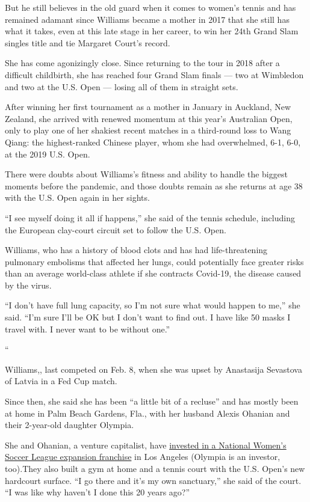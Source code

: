 But he still believes in the old guard when it comes to women's tennis
and has remained adamant since Williams became a mother in 2017 that she
still has what it takes, even at this late stage in her career, to win
her 24th Grand Slam singles title and tie Margaret Court's record.

She has come agonizingly close. Since returning to the tour in 2018
after a difficult childbirth, she has reached four Grand Slam finals ---
two at Wimbledon and two at the U.S. Open --- losing all of them in
straight sets.

After winning her first tournament as a mother in January in Auckland,
New Zealand, she arrived with renewed momentum at this year's Australian
Open, only to play one of her shakiest recent matches in a third-round
loss to Wang Qiang: the highest-ranked Chinese player, whom she had
overwhelmed, 6-1, 6-0, at the 2019 U.S. Open.

There were doubts about Williams's fitness and ability to handle the
biggest moments before the pandemic, and those doubts remain as she
returns at age 38 with the U.S. Open again in her sights.

``I see myself doing it all if happens,'' she said of the tennis
schedule, including the European clay-court circuit set to follow the
U.S. Open.

Williams, who has a history of blood clots and has had life-threatening
pulmonary embolisms that affected her lungs, could potentially face
greater risks than an average world-class athlete if she contracts
Covid-19, the disease caused by the virus.

``I don't have full lung capacity, so I'm not sure what would happen to
me,'' she said. ``I'm sure I'll be OK but I don't want to find out. I
have like 50 masks I travel with. I never want to be without one.''

``

Williams,, last competed on Feb. 8, when she was upset by Anastasija
Sevastova of Latvia in a Fed Cup match.

Since then, she said she has been ``a little bit of a recluse'' and has
mostly been at home in Palm Beach Gardens, Fla., with her husband Alexis
Ohanian and their 2-year-old daughter Olympia.

She and Ohanian, a venture capitalist, have
\href{https://www.nytimes.com/2020/07/21/sports/soccer/angel-city-fc-nwsl.html}{invested
in a National Women's Soccer League expansion franchise} in Los Angeles
(Olympia is an investor, too).They also built a gym at home and a tennis
court with the U.S. Open's new hardcourt surface. ``I go there and it's
my own sanctuary,'' she said of the court. ``I was like why haven't I
done this 20 years ago?''

